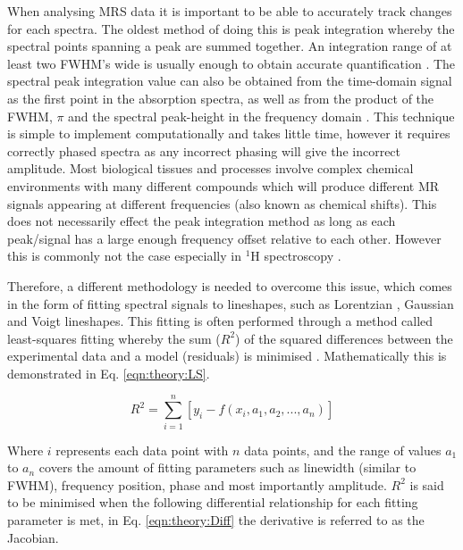When analysing \ac{MRS} data it is important to be able to accurately track changes for each spectra. The oldest method of doing this is peak integration whereby the spectral points spanning a peak are summed together. An integration range of at least two \ac{FWHM}'s wide is usually enough to obtain accurate quantification \cite{Near2021PreprocessingRecommendations}. The spectral peak integration value can also be obtained from the time-domain signal as the first point in the absorption spectra, as well as from the product of the \ac{FWHM}, $\pi$ and the spectral peak-height in the frequency domain \cite{deGraaf2019InSpectroscopy}. This technique is simple to implement computationally and takes little time, however it requires correctly phased spectra as any incorrect phasing will give the incorrect amplitude. Most biological tissues and processes involve complex chemical environments with many different compounds which will produce different MR signals appearing at different frequencies (also known as chemical shifts). This does not necessarily effect the peak integration method as long as each peak/signal has a large enough frequency offset relative to each other. However this is commonly not the case especially in $^1$H spectroscopy \cite{Alger2010QuantitativeReview}. 

Therefore, a different methodology is needed to overcome this issue, which comes in the form of fitting spectral signals to lineshapes, such as Lorentzian \cite{Lorentz1895TheHeat}, Gaussian and Voigt \cite{Near2021PreprocessingRecommendations} lineshapes. This fitting is often performed through a method called least-squares \cite{Golub1973TheSeparate} fitting whereby the sum ($R^2$) of the squared differences between the experimental data and a model (residuals) is minimised \cite{Vanhamme2001MRMethods}. Mathematically this is demonstrated in Eq. \ref{eqn:theory:LS}.

\begin{equation}
    R^2 = \sum_{i=1}^{n}[y_i - f(x_i,a_1,a_2,...,a_n)]
    \label{eqn:theory:LS}
\end{equation}

\noindent Where $i$ represents each data point with $n$ data points, and the range of values $a_1$ to $a_n$ covers the amount of fitting parameters such as linewidth (similar to \ac{FWHM}), frequency position, phase and most importantly amplitude. $R^2$ is said to be minimised when the following differential relationship for each fitting parameter is met, in Eq. \ref{eqn:theory:Diff} the derivative is referred to as the Jacobian.

